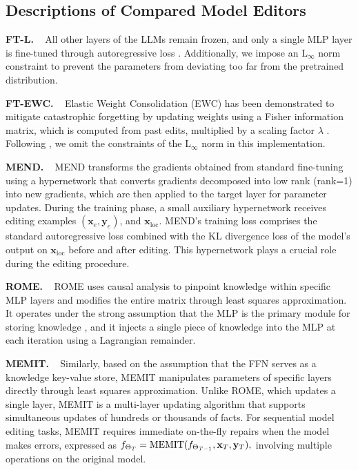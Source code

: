 \documentclass{article}
\begin{document}
\subsection{Descriptions of Compared Model Editors}\label{baselines}
\textbf{FT-L.} ~
All other layers of the LLMs remain frozen, and only a single MLP layer is fine-tuned through autoregressive loss \cite{rome}. 
Additionally, we impose an $\text{L}_{\infty}$ norm constraint to prevent the parameters from deviating too far from the pretrained distribution.

\textbf{FT-EWC.} ~
Elastic Weight Consolidation (EWC) has been demonstrated to mitigate catastrophic forgetting by updating weights using a Fisher information matrix, which is computed from past edits, multiplied by a scaling factor $\lambda$ \cite{ewc}.
Following \cite{grace}, we omit the constraints of the $\text{L}_{\infty}$ norm in this implementation.

\textbf{MEND.} ~
MEND \cite{mend} transforms the gradients obtained from standard fine-tuning using a hypernetwork that converts gradients decomposed into low rank (rank=1) into new gradients, which are then applied to the target layer for parameter updates.
During the training phase, a small auxiliary hypernetwork receives editing examples $(\mathbf{x}_e, \mathbf{y}_e)$, and $\mathbf{x}_{\text{loc}}$.
MEND's training loss comprises the standard autoregressive loss combined with the KL divergence loss of the model's output on $\mathbf{x}_{\text{loc}}$ before and after editing.
This hypernetwork plays a crucial role during the editing procedure.

\textbf{ROME.} ~
ROME \cite{rome} uses causal analysis to pinpoint knowledge within specific MLP layers and modifies the entire matrix through least squares approximation.
It operates under the strong assumption that the MLP is the primary module for storing knowledge \cite{geva-etal-2021-transformer}, and it injects a single piece of knowledge into the MLP at each iteration using a Lagrangian remainder.

\textbf{MEMIT.} ~
Similarly, based on the assumption that the FFN serves as a knowledge key-value store, MEMIT \cite{memit} manipulates parameters of specific layers directly through least squares approximation.
Unlike ROME, which updates a single layer, MEMIT is a multi-layer updating algorithm that supports simultaneous updates of hundreds or thousands of facts.
For sequential model editing tasks, MEMIT requires immediate on-the-fly repairs when the model makes errors, expressed as $f_{\Theta_{T}} = {\rm MEMIT}(f_{\Theta_{T-1}}, \mathbf{x}_T, \mathbf{y}_T),$ involving multiple operations on the original model.
\end{document}
